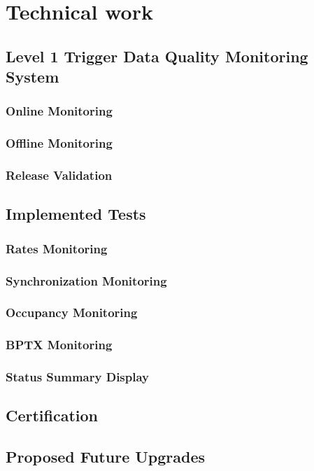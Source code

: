\chapter{Technical work}

\section{Level 1 Trigger Data Quality Monitoring System}

\subsection{Online Monitoring}

\subsection{Offline Monitoring}

\subsection{Release Validation}

\section{Implemented Tests}

\subsection{Rates Monitoring}

\subsection{Synchronization Monitoring}

\subsection{Occupancy Monitoring}

\subsection{BPTX Monitoring}

\subsection{Status Summary Display}

\section{Certification}

\section{Proposed Future Upgrades}

